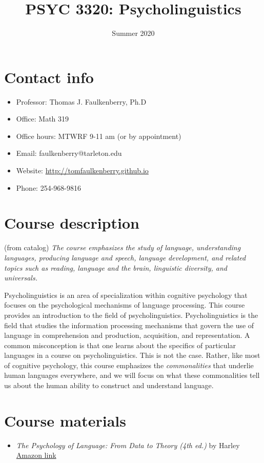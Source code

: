 \documentclass[10pt]{article}
\date{Summer 2020}
\title{PSYC 3320: Psycholinguistics}
\begin{document}
\maketitle

\section*{Contact info}
\label{sec:org4a817c9}
\begin{itemize}
\item Professor: Thomas J. Faulkenberry, Ph.D
\item Office: Math 319
\item Office hours: MTWRF 9-11 am (or by appointment)
\item Email: faulkenberry@tarleton.edu
\item Website: \url{http://tomfaulkenberry.github.io}
\item Phone: 254-968-9816
\end{itemize}

\section*{Course description}
\label{sec:org00221bd}

(from catalog) \emph{The course emphasizes the study of language, understanding languages, producing language and speech, language development, and related topics such as reading, language and the brain, linguistic diversity, and universals.}

Psycholinguistics is an area of specialization within cognitive psychology that focuses on the psychological mechanisms of language processing.  This course provides an introduction to the field of psycholinguistics. Psycholinguistics is the field that studies the information processing mechanisms that govern the use of language in comprehension and production, acquisition, and representation.  A common misconception is that one learns about the specifics of particular languages in a course on psycholinguistics.  This is not the case.  Rather, like most of cognitive psychology, this course emphasizes the \emph{commonalities} that underlie human languages everywhere, and we will focus on what these commonalities tell us about the human ability to construct and understand language. 

\section*{Course materials}
\label{sec:org76be4b8}
\begin{itemize}
\item \emph{The Psychology of Language: From Data to Theory (4th ed.)} by Harley \href{https://www.amazon.com/Psychology-Language-Data-Theory/dp/1848720890}{Amazon link}
\end{itemize}
\end{document}

